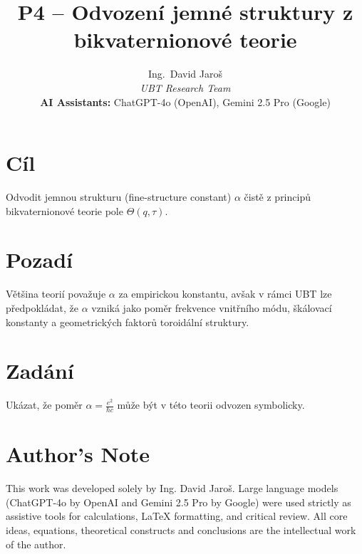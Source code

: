 \documentclass{article}
\title{P4 – Odvození jemné struktury z bikvaternionové teorie}
\author{
Ing.~David Jaroš \\
\textit{UBT Research Team} \\
\textbf{AI Assistants:} ChatGPT-4o (OpenAI), Gemini 2.5 Pro (Google) \\
}
\date{}
\begin{document}
\maketitle

\section*{Cíl}
Odvodit jemnou strukturu (fine-structure constant) $\alpha$ čistě z principů bikvaternionové teorie pole $\Theta(q, \tau)$.

\section*{Pozadí}
Většina teorií považuje $\alpha$ za empirickou konstantu, avšak v rámci UBT lze předpokládat, že $\alpha$ vzniká jako poměr frekvence vnitřního módu, škálovací konstanty a geometrických faktorů toroidální struktury.

\section*{Zadání}
Ukázat, že poměr $\alpha = \frac{e^2}{\hbar c}$ může být v této teorii odvozen symbolicky.


\section*{Author's Note}

This work was developed solely by Ing. David Jaroš.  
Large language models (ChatGPT-4o by OpenAI and Gemini 2.5 Pro by Google) were used strictly as assistive tools for calculations, LaTeX formatting, and critical review.  
All core ideas, equations, theoretical constructs and conclusions are the intellectual work of the author.
\end{document}
